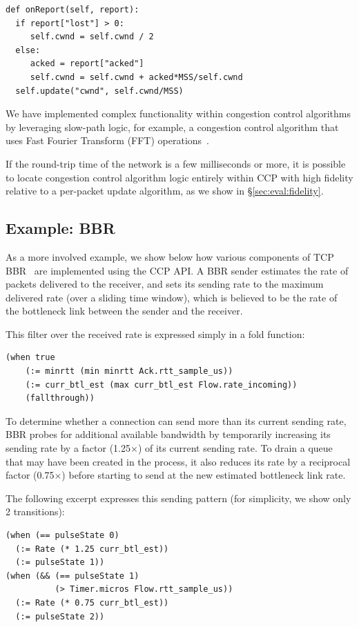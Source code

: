 {\footnotesize
\begin{verbatim}
def onReport(self, report):
  if report["lost"] > 0:
     self.cwnd = self.cwnd / 2
  else:
     acked = report["acked"]
     self.cwnd = self.cwnd + acked*MSS/self.cwnd
  self.update("cwnd", self.cwnd/MSS)
\end{verbatim}
}

We have implemented complex functionality within congestion control algorithms
by leveraging slow-path logic, for example, a congestion control
algorithm that uses Fast Fourier Transform (FFT) operations~\cite{nimbus}.

If the round-trip time of the network is a few milliseconds or more,
it is possible to locate congestion control algorithm logic entirely within CCP
with high fidelity relative to a per-packet update algorithm, as we show in \S\ref{sec:eval:fidelity}.

\subsection{Example: BBR}
\label{s:ccp:bbr}
As a more involved example, we show below
how various components of TCP BBR~\cite{bbr} are implemented using the CCP API.
A BBR sender estimates the rate of packets delivered to the receiver, and sets
its sending rate to the maximum delivered rate (over a sliding time
window), which is believed to be the rate of the bottleneck link between the sender
and the receiver.

This filter over the received rate is expressed simply in a fold function:
{\footnotesize
\begin{verbatim}
(when true
    (:= minrtt (min minrtt Ack.rtt_sample_us))
    (:= curr_btl_est (max curr_btl_est Flow.rate_incoming))
    (fallthrough))
\end{verbatim}
}

To determine whether a connection can send more than its current sending rate,
BBR probes for additional available bandwidth by temporarily increasing its
sending rate by a factor (1.25$\times$) of its current sending rate.
%
To drain a queue that may have been created in the process, it also reduces its
rate by a reciprocal factor (0.75$\times$) before starting to send at the new estimated
bottleneck link rate.

The following excerpt expresses this sending pattern (for simplicity, we show only 2 transitions):
{\footnotesize
\begin{verbatim}
(when (== pulseState 0)
  (:= Rate (* 1.25 curr_btl_est))
  (:= pulseState 1))
(when (&& (== pulseState 1) 
          (> Timer.micros Flow.rtt_sample_us))
  (:= Rate (* 0.75 curr_btl_est))
  (:= pulseState 2))
\end{verbatim}
}


